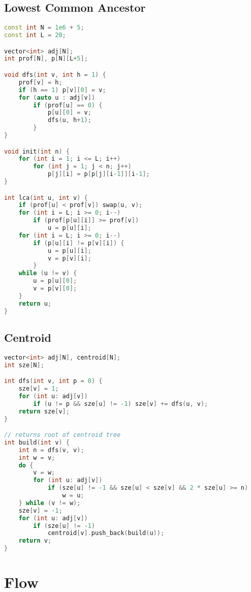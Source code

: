 \documentclass{article}
\begin{document}
\subsection{Lowest Common Ancestor}
\begin{lstlisting}[language=C++]
const int N = 1e6 + 5;
const int L = 20;

vector<int> adj[N];
int prof[N], p[N][L+5];

void dfs(int v, int h = 1) {
	prof[v] = h;
	if (h == 1) p[v][0] = v;
	for (auto u : adj[v])
		if (prof[u] == 0) {
			p[u][0] = v;
			dfs(u, h+1);
		}
}

void init(int n) {
	for (int i = 1; i <= L; i++)
		for (int j = 1; j < n; j++)
			p[j][i] = p[p[j][i-1]][i-1];
}

int lca(int u, int v) {
	if (prof[u] < prof[v]) swap(u, v);
	for (int i = L; i >= 0; i--)
		if (prof[p[u][i]] >= prof[v])
			u = p[u][i];
	for (int i = L; i >= 0; i--)
		if (p[u][i] != p[v][i]) {
			u = p[u][i];
			v = p[v][i];
		}
	while (u != v) {
		u = p[u][0];
		v = p[v][0];
	}
	return u;
}
\end{lstlisting}
\subsection{Centroid}
\begin{lstlisting}[language=C++]
vector<int> adj[N], centroid[N];
int sze[N];

int dfs(int v, int p = 0) {
    sze[v] = 1;
    for (int u: adj[v])
        if (u != p && sze[u] != -1) sze[v] += dfs(u, v);
    return sze[v];
}

// returns root of centroid tree
int build(int v) {
    int n = dfs(v, v);
    int w = v;
    do {
        v = w;
        for (int u: adj[v])
            if (sze[u] != -1 && sze[u] < sze[v] && 2 * sze[u] >= n)
                w = u;
    } while (v != w);
    sze[v] = -1;
    for (int u: adj[v])
        if (sze[u] != -1)
            centroid[v].push_back(build(u));
    return v;
}\end{lstlisting}
\section{Flow}
\end{document}
